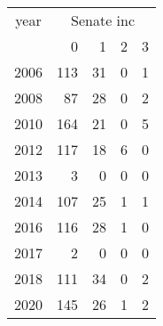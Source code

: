 \footnotesize\begin{tabular}[t]{lrrrr}
\toprule
\multicolumn{1}{c}{year} & \multicolumn{4}{c}{Senate inc} \\
\cmidrule(l{3pt}r{3pt}){1-1} \cmidrule(l{3pt}r{3pt}){2-5}
  & 0 & 1 & 2 & 3\\
\midrule
2006 & 113 & 31 & 0 & 1\\
2008 & 87 & 28 & 0 & 2\\
2010 & 164 & 21 & 0 & 5\\
2012 & 117 & 18 & 6 & 0\\
2013 & 3 & 0 & 0 & 0\\
2014 & 107 & 25 & 1 & 1\\
2016 & 116 & 28 & 1 & 0\\
2017 & 2 & 0 & 0 & 0\\
2018 & 111 & 34 & 0 & 2\\
2020 & 145 & 26 & 1 & 2\\
\bottomrule
\end{tabular}
